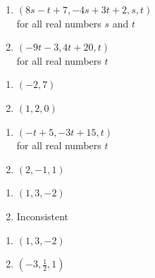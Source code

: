 \documentclass{ximera}
\begin{document}
\begin{multicols}{2}
\begin{enumerate}
\setcounter{enumi}{\value{HW}}


\item $(8s - t + 7, -4s + 3t + 2, s, t)$ \\ for all real numbers $s$ and $t$
\item $(-9t - 3, 4t + 20, t)$ \\ for all real numbers $t$


\setcounter{HW}{\value{enumi}}
\end{enumerate}
\end{multicols}


\begin{multicols}{2}
\begin{enumerate}
\setcounter{enumi}{\value{HW}}

\item $(-2, 7)$
\item $(1, 2, 0)$

\setcounter{HW}{\value{enumi}}
\end{enumerate}
\end{multicols}


\begin{multicols}{2}
\begin{enumerate}
\setcounter{enumi}{\value{HW}}


\item $(-t + 5, -3t + 15, t)$\\
for all real numbers $t$
\item $(2,-1,1)$


\setcounter{HW}{\value{enumi}}
\end{enumerate}
\end{multicols}


\begin{multicols}{2}
\begin{enumerate}
\setcounter{enumi}{\value{HW}}

\item $(1,3,-2)$
\item Inconsistent


\setcounter{HW}{\value{enumi}}
\end{enumerate}
\end{multicols}


\begin{multicols}{2}
\begin{enumerate}
\setcounter{enumi}{\value{HW}}


\item $(1,3,-2)$
\item $\left(-3,\frac{1}{2},1\right)$

\setcounter{HW}{\value{enumi}}
\end{enumerate}
\end{multicols}
\end{document}
